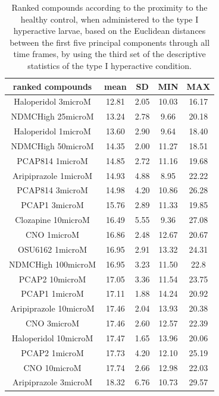 \begin{table}[h!]\tiny
\centering
\caption{Ranked compounds according to the proximity to the healthy control, when administered to the type I hyperactive larvae, based on the Euclidean distances between the first five principal components through all time frames, by using the third set of the descriptive statistics of the type I hyperactive condition.}
\begin{tabular}{|c|c|c|c|c|}
\hline
ranked compounds             & mean & SD   & MIN  & MAX   \\ \hline
Haloperidol 3microM   & 12.81 & 2.05  & 10.03 & 16.17 \\ \hline
NDMCHigh 25microM     & 13.24 & 2.78  & 9.66  & 20.18 \\ \hline
Haloperidol 1microM   & 13.60  & 2.90   & 9.64  & 18.40  \\ \hline
NDMCHigh 50microM     & 14.35 & 2.00     & 11.27 & 18.51 \\ \hline
PCAP814 1microM       & 14.85 & 2.72  & 11.16 & 19.68 \\ \hline
Aripiprazole 1microM  & 14.93 & 4.88  & 8.95  & 22.22 \\ \hline
PCAP814 3microM       & 14.98 & 4.20   & 10.86 & 26.28 \\ \hline
PCAP1 3microM         & 15.76 & 2.89  & 11.33 & 19.85 \\ \hline
Clozapine 10microM    & 16.49 & 5.55  & 9.36  & 27.08 \\ \hline
CNO 1microM           & 16.86 & 2.48  & 12.67 & 20.67 \\ \hline
OSU6162 1microM       & 16.95 & 2.91  & 13.32 & 24.31 \\ \hline
NDMCHigh 100microM    & 16.95 & 3.23  & 11.50  & 22.8  \\ \hline
PCAP2 10microM        & 17.05 & 3.36  & 11.54 & 23.75 \\ \hline
PCAP1 1microM         & 17.11 & 1.88  & 14.24 & 20.92 \\ \hline
Aripiprazole 10microM & 17.46 & 2.04  & 13.93 & 20.38 \\ \hline
CNO 3microM           & 17.46 & 2.60   & 12.57 & 22.39 \\ \hline
Haloperidol 10microM  & 17.47 & 1.65  & 13.96 & 20.06 \\ \hline
PCAP2 1microM         & 17.73 & 4.20   & 12.10  & 25.19 \\ \hline
CNO 10microM          & 17.74 & 2.66  & 12.98 & 22.03 \\ \hline
Aripiprazole 3microM  & 18.32 & 6.76  & 10.73 & 29.57 \\ \hline

\end{tabular}
\end{table}
